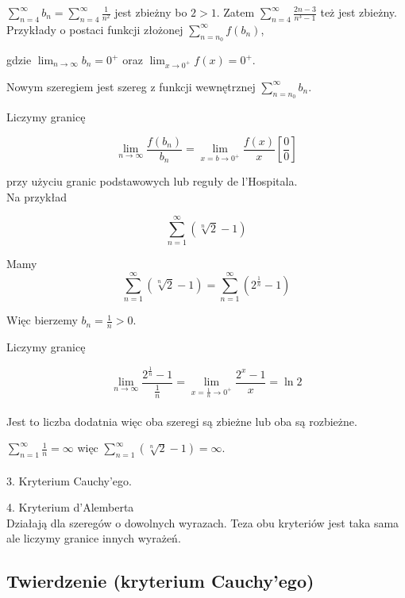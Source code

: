 $ \sum\limits_{n = 4}^{\infty} b_n = \sum\limits_{n = 4}^{\infty} \frac{1}{n^2} $ jest zbieżny bo $ 2 > 1 $.
Zatem $ \sum\limits_{n = 4}^{\infty} \frac{2n - 3}{n^3 - 1} $ też jest zbieżny. \\

Przykłady o postaci funkcji złożonej $ \sum\limits_{n = n_0}^{\infty} f(b_n) $,

gdzie $ \lim_{n \to \infty} b_n = 0^+ $ oraz $ \lim_{x \to 0^+} f(x) = 0^+ $.

Nowym szeregiem jest szereg z funkcji wewnętrznej $ \sum\limits_{n = n_0}^{\infty} b_n $.

Liczymy granicę 

$$ \lim_{n \to \infty} \frac{f(b_n)}{b_n} = \lim_{x=b \to 0^+} \frac{f(x)}{x} \left[ \frac{0}{0} \right] $$

przy użyciu granic podstawowych lub reguły de l'Hospitala. \\

Na przykład

$$ \sum\limits_{n = 1}^{\infty} \left( \sqrt[n]{2} - 1 \right) $$

Mamy $$ \sum\limits_{n = 1}^{\infty} \left( \sqrt[n]{2} - 1 \right) = \sum\limits_{n = 1}^{\infty} \left( 2^{\frac{1}{n}} - 1 \right) $$

Więc bierzemy $ b_n = \frac{1}{n} > 0 $.

Liczymy granicę

$$ \lim_{n \to \infty} \frac{2^{\frac{1}{n}} - 1}{\frac{1}{n}} = \lim_{x = \frac{1}{n} \to 0^+} \frac{2^x - 1}{x} = \ln 2 $$ \\

Jest to liczba dodatnia więc oba szeregi są zbieżne lub oba są rozbieżne.

$ \sum\limits_{n = 1}^{\infty} \frac{1}{n} = \infty $ więc $ \sum\limits_{n = 1}^{\infty} \left( \sqrt[n]{2} - 1 \right) = \infty $. \\ \\

3. Kryterium Cauchy'ego.

4. Kryterium d'Alemberta \\

Działają dla szeregów o dowolnych wyrazach. Teza obu kryteriów jest taka sama ale liczymy granice innych wyrażeń.


\subsection*{Twierdzenie (kryterium Cauchy'ego)}

